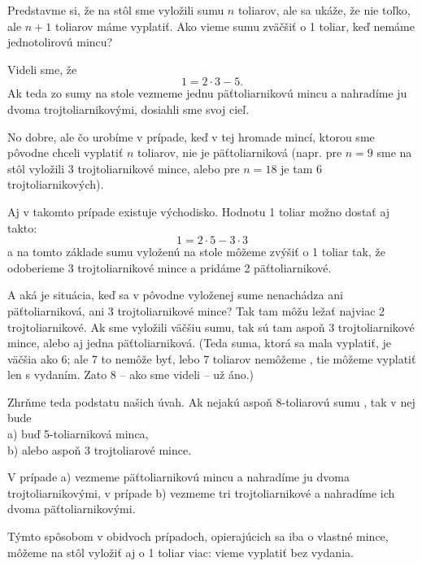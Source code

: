 {Predstavme si, že na stôl sme vyložili sumu $n$ toliarov, ale sa ukáže, že nie toľko, ale $n+1$ toliarov máme vyplatiť. Ako vieme sumu zväčšiť o 1 toliar, keď nemáme jednotolirovú mincu?

Videli sme, že
$$1=2\cdot 3- 5.$$
Ak teda zo sumy na stole vezmeme jednu päťtoliarnikovú mincu a nahradíme ju dvoma trojtoliarnikovými, dosiahli sme svoj cieľ.

No dobre, ale čo urobíme v prípade, keď v tej hromade mincí, ktorou sme pôvodne chceli vyplatiť $n$ toliarov, nie je päťtoliarniková (napr. pre $n=9$ sme na stôl vyložili 3 trojtoliarnikové mince, alebo pre $n=18$ je tam 6 trojtoliarnikových).

Aj v takomto prípade existuje východisko. Hodnotu 1 toliar možno dostať aj takto: $$1=2\cdot 5 - 3\cdot 3$$ a na tomto základe sumu vyloženú na stole môžeme zvýšiť o 1 toliar tak, že odoberieme 3 trojtoliarnikové mince a pridáme 2 päťtoliarnikové.

A aká je situácia, keď sa v pôvodne vyloženej sume nenachádza ani päťtoliarniková, ani 3 trojtoliarnikové mince? Tak tam môžu ležať najviac 2 trojtoliarnikové. Ak sme vyložili väčšiu sumu, tak sú tam aspoň 3 trojtoliarnikové mince, alebo aj jedna päťtoliarniková. (Teda suma, ktorá sa mala vyplatiť, je väčšia ako 6; ale 7 to nemôže byť, lebo 7 toliarov nemôžeme , tie môžeme vyplatiť len s vydaním. Zato 8 -- ako sme videli -- už áno.)

Zhrňme teda podstatu našich úvah. Ak nejakú aspoň 8-toliarovú sumu , tak v nej bude\\
a) buď 5-toliarniková minca,\\
b) alebo aspoň 3 trojtoliarové mince.

 V prípade a) vezmeme päťtoliarnikovú mincu a nahradíme ju dvoma trojtoliarnikovými, v prípade b) vezmeme tri trojtoliarnikové a nahradíme ich dvoma päťtoliarnikovými.

Týmto spôsobom v obidvoch prípadoch, opierajúcich sa iba o vlastné mince, môžeme na stôl vyložiť aj o 1 toliar viac: vieme vyplatiť bez vydania.

}
